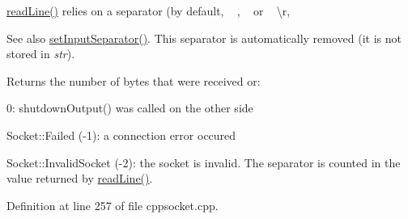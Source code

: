 \mbox{\hyperlink{classcppu_1_1_socket_buffer_a222769d3776b9cbd3a727ee1f0e60358}{read\+Line()}} relies on a separator (by default, ~\newline
, ~\newline
 or ~\newline
\textbackslash{}r, \begin{DoxySeeAlso}{See also}
\mbox{\hyperlink{classcppu_1_1_socket_buffer_acadf4540c1e3eba67b014753b84b482c}{set\+Input\+Separator()}}. This separator is automatically removed (it is not stored in {\itshape str}).
\end{DoxySeeAlso}
\begin{DoxyReturn}{Returns}
the number of bytes that were received or\+:
\begin{DoxyItemize}
\item 0\+: shutdown\+Output() was called on the other side
\item Socket\+::\+Failed (-\/1)\+: a connection error occured
\item Socket\+::\+Invalid\+Socket (-\/2)\+: the socket is invalid. The separator is counted in the value returned by \mbox{\hyperlink{classcppu_1_1_socket_buffer_a222769d3776b9cbd3a727ee1f0e60358}{read\+Line()}}. 
\end{DoxyItemize}
\end{DoxyReturn}


Definition at line 257 of file cppsocket.\+cpp.


